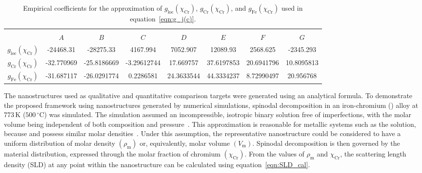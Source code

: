 \documentclass[preprint, 5p, times, twocolumn]{elsarticle}
\begin{document}
\begin{table}
\centering
\begin{tabular}{c c c c c c c c}
\hline \vspace{-0.4 cm} \\ 
                                      & $A$		      & $B$	          & $C$           & $D$           & $E$            & $F$            & $G$\\
\hline
$g_{\text{loc}}(\chi_{\text{Cr}})$    & -24468.31		& -28275.33	    & 4167.994      & 7052.907      & 12089.93       & 2568.625       & -2345.293\\
$g_{\text{Cr}}(\chi_{\text{Cr}})$     & -32.770969		& -25.8186669	& -3.29612744   & 17.669757     & 37.6197853     & 20.6941796     & 10.8095813\\
$g_{\text{Fe}}(\chi_{\text{Cr}})$     & -31.687117		& -26.0291774	& 0.2286581     & 24.3633544    & 44.3334237     & 8.72990497     & 20.956768\\
\hline
\end{tabular}
\caption{Empirical coefficients for the approximation of $g_{\text{loc}}(\chi_{\text{Cr}})$, $g_{\text{Cr}}(\chi_{\text{Cr}})$, and $g_{\text{Fe}}(\chi_{\text{Cr}})$ used in equation~\ref{eqn:g_j(c)}. \label{tab:spiniodal_params}}
\end{table}

The nanostructures used as qualitative and quantitative comparison targets were generated using an analytical formula. To demonstrate the proposed framework using nanostructures generated by numerical simulations, spinodal decomposition in an iron-chromium () alloy at 773\,K ($500\,^{\circ}$C) was simulated. The simulation assumed an incompressible, isotropic binary solution free of imperfections, with the molar volume being independent of both composition and pressure~\cite{cahn1961on, coehn2008chapter}. This approximation is reasonable for metallic systems such as the  solution, because  and  possess similar molar densities~\cite{coehn2008chapter}. Under this assumption, the representative nanostructure could be considered to have a uniform distribution of molar density $(\rho_{\text{m}})$ or, equivalently, molar volume $(V_{\text{m}})$. Spinodal decomposition is then governed by the material distribution, expressed through the molar fraction of chromium $(\chi_{\text{Cr}})$. From the values of $\rho_{\text{m}}$ and $\chi_{\text{Cr}}$, the scattering length density (SLD) at any point within the nanostructure can be calculated using equation~\ref{eqn:SLD_cal}.
\end{document}
